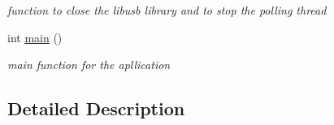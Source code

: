 \begin{DoxyCompactItemize}
\begin{DoxyCompactList}\small\item\em function to close the libusb library and to stop the polling thread \end{DoxyCompactList}\item 
\hypertarget{group__xbcdeamon_gae66f6b31b5ad750f1fe042a706a4e3d4}{int \hyperlink{group__xbcdeamon_gae66f6b31b5ad750f1fe042a706a4e3d4}{main} ()}\label{group__xbcdeamon_gae66f6b31b5ad750f1fe042a706a4e3d4}

\begin{DoxyCompactList}\small\item\em main function for the apllication \end{DoxyCompactList}\end{DoxyCompactItemize}


\subsection{Detailed Description}


